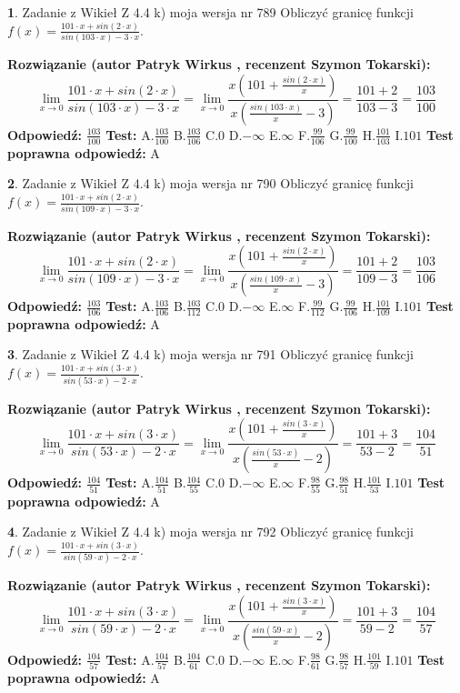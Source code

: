 \documentclass[12pt, a4paper]{article}
\theoremstyle{definition} %
\newtheorem{zad}{}
\newcommand{\zadStart}[1]{\begin{zad}#1\newline}
\newcommand{\zadStop}{\end{zad}}
\newcommand{\rozwStart}[2]{\noindent \textbf{Rozwiązanie (autor #1 , recenzent #2): }\newline}
\newcommand{\rozwStop}{\newline}
\newcommand{\odpStart}{\noindent \textbf{Odpowiedź:}\newline}
\newcommand{\odpStop}{\newline}
\newcommand{\testStart}{\noindent \textbf{Test:}\newline}
\newcommand{\testStop}{\newline}
\newcommand{\kluczStart}{\noindent \textbf{Test poprawna odpowiedź:}\newline}
\newcommand{\kluczStop}{\newline}
\begin{document}
\zadStart{Zadanie z Wikieł Z 4.4 k) moja wersja nr 789}
Obliczyć granicę funkcji $f(x)=\frac{101\cdot x +sin(2\cdot x)}{sin(103\cdot x) -3\cdot x}$.
\zadStop
\rozwStart{Patryk Wirkus}{Szymon Tokarski}
$$\lim\limits_{x\to 0}\frac{101\cdot x +sin(2\cdot x)}{sin(103\cdot x) -3\cdot x}
=\lim\limits_{x\to 0}\frac{x(101+\frac{sin(2\cdot x)}{x})}{x(\frac{sin(103\cdot x)}{x}-3)}
=\frac{101+2}{103-3} = \frac{103}{100}$$
\rozwStop
\odpStart
$\frac{103}{100}$
\odpStop
\testStart
A.$\frac{103}{100}$
B.$\frac{103}{106}$
C.$0$
D.$-\infty$
E.$\infty$
F.$\frac{99}{106}$
G.$\frac{99}{100}$
H.$\frac{101}{103}$
I.$101$
\testStop
\kluczStart
A
\kluczStop



\zadStart{Zadanie z Wikieł Z 4.4 k) moja wersja nr 790}
Obliczyć granicę funkcji $f(x)=\frac{101\cdot x +sin(2\cdot x)}{sin(109\cdot x) -3\cdot x}$.
\zadStop
\rozwStart{Patryk Wirkus}{Szymon Tokarski}
$$\lim\limits_{x\to 0}\frac{101\cdot x +sin(2\cdot x)}{sin(109\cdot x) -3\cdot x}
=\lim\limits_{x\to 0}\frac{x(101+\frac{sin(2\cdot x)}{x})}{x(\frac{sin(109\cdot x)}{x}-3)}
=\frac{101+2}{109-3} = \frac{103}{106}$$
\rozwStop
\odpStart
$\frac{103}{106}$
\odpStop
\testStart
A.$\frac{103}{106}$
B.$\frac{103}{112}$
C.$0$
D.$-\infty$
E.$\infty$
F.$\frac{99}{112}$
G.$\frac{99}{106}$
H.$\frac{101}{109}$
I.$101$
\testStop
\kluczStart
A
\kluczStop



\zadStart{Zadanie z Wikieł Z 4.4 k) moja wersja nr 791}
Obliczyć granicę funkcji $f(x)=\frac{101\cdot x +sin(3\cdot x)}{sin(53\cdot x) -2\cdot x}$.
\zadStop
\rozwStart{Patryk Wirkus}{Szymon Tokarski}
$$\lim\limits_{x\to 0}\frac{101\cdot x +sin(3\cdot x)}{sin(53\cdot x) -2\cdot x}
=\lim\limits_{x\to 0}\frac{x(101+\frac{sin(3\cdot x)}{x})}{x(\frac{sin(53\cdot x)}{x}-2)}
=\frac{101+3}{53-2} = \frac{104}{51}$$
\rozwStop
\odpStart
$\frac{104}{51}$
\odpStop
\testStart
A.$\frac{104}{51}$
B.$\frac{104}{55}$
C.$0$
D.$-\infty$
E.$\infty$
F.$\frac{98}{55}$
G.$\frac{98}{51}$
H.$\frac{101}{53}$
I.$101$
\testStop
\kluczStart
A
\kluczStop



\zadStart{Zadanie z Wikieł Z 4.4 k) moja wersja nr 792}
Obliczyć granicę funkcji $f(x)=\frac{101\cdot x +sin(3\cdot x)}{sin(59\cdot x) -2\cdot x}$.
\zadStop
\rozwStart{Patryk Wirkus}{Szymon Tokarski}
$$\lim\limits_{x\to 0}\frac{101\cdot x +sin(3\cdot x)}{sin(59\cdot x) -2\cdot x}
=\lim\limits_{x\to 0}\frac{x(101+\frac{sin(3\cdot x)}{x})}{x(\frac{sin(59\cdot x)}{x}-2)}
=\frac{101+3}{59-2} = \frac{104}{57}$$
\rozwStop
\odpStart
$\frac{104}{57}$
\odpStop
\testStart
A.$\frac{104}{57}$
B.$\frac{104}{61}$
C.$0$
D.$-\infty$
E.$\infty$
F.$\frac{98}{61}$
G.$\frac{98}{57}$
H.$\frac{101}{59}$
I.$101$
\testStop
\kluczStart
A
\kluczStop
\end{document}
